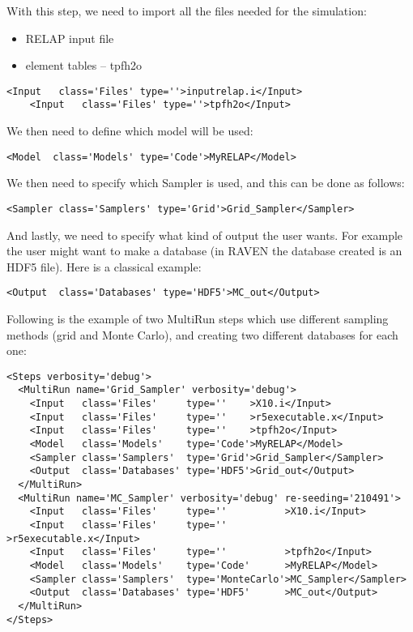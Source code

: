With this step, we need to import all the files needed for the simulation:
\begin{itemize}
  \item RELAP input file
  \item element tables -- tpfh2o
\end{itemize}
\begin{lstlisting}[style=XML,morekeywords={name,class,type}]
    <Input   class='Files' type=''>inputrelap.i</Input>
    <Input   class='Files' type=''>tpfh2o</Input>
\end{lstlisting}
We then need to define which model will be used:
\begin{lstlisting}[style=XML]
    <Model  class='Models' type='Code'>MyRELAP</Model>
\end{lstlisting}
We then need to specify which Sampler is used, and this can be done as follows:
\begin{lstlisting}[style=XML]
    <Sampler class='Samplers' type='Grid'>Grid_Sampler</Sampler>
\end{lstlisting}
And lastly, we need to specify what kind of output the user wants.
%
For example the user might want to make a database (in RAVEN the database
created is an HDF5 file).
%
Here is a classical example:
\begin{lstlisting}[style=XML,morekeywords={class,type}]
    <Output  class='Databases' type='HDF5'>MC_out</Output>
\end{lstlisting}
Following is the example of two MultiRun steps which use different sampling
methods (grid and Monte Carlo), and creating two different databases for each
one:
\begin{lstlisting}[style=XML]
<Steps verbosity='debug'>
  <MultiRun name='Grid_Sampler' verbosity='debug'>
    <Input   class='Files'     type=''    >X10.i</Input>
    <Input   class='Files'     type=''    >r5executable.x</Input>
    <Input   class='Files'     type=''    >tpfh2o</Input>
    <Model   class='Models'    type='Code'>MyRELAP</Model>
    <Sampler class='Samplers'  type='Grid'>Grid_Sampler</Sampler>
    <Output  class='Databases' type='HDF5'>Grid_out</Output>
  </MultiRun>
  <MultiRun name='MC_Sampler' verbosity='debug' re-seeding='210491'>
    <Input   class='Files'     type=''          >X10.i</Input>
    <Input   class='Files'     type=''          >r5executable.x</Input>
    <Input   class='Files'     type=''          >tpfh2o</Input>
    <Model   class='Models'    type='Code'      >MyRELAP</Model>
    <Sampler class='Samplers'  type='MonteCarlo'>MC_Sampler</Sampler>
    <Output  class='Databases' type='HDF5'      >MC_out</Output>
  </MultiRun>
</Steps>
\end{lstlisting}
